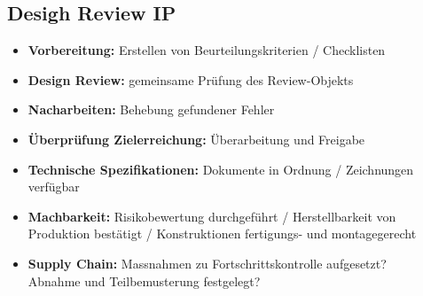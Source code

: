 \subsection{Desigh Review \hfill IP}
    \begin{scriptsize}
        \begin{itemize}
            \item \textbf{Vorbereitung:} Erstellen von Beurteilungskriterien / Checklisten
            \item \textbf{Design Review:} gemeinsame Prüfung des Review-Objekts
            \item \textbf{Nacharbeiten:} Behebung gefundener Fehler
            \item \textbf{Überprüfung Zielerreichung:} Überarbeitung und Freigabe
            \item \textbf{Technische Spezifikationen:} Dokumente in Ordnung / Zeichnungen verfügbar
            \item \textbf{Machbarkeit:} Risikobewertung durchgeführt / Herstellbarkeit von Produktion bestätigt / Konstruktionen fertigungs- und montagegerecht
            \item \textbf{Supply Chain:} Massnahmen zu Fortschrittskontrolle aufgesetzt? \\ Abnahme und Teilbemusterung festgelegt?
        \end{itemize}
    \end{scriptsize}